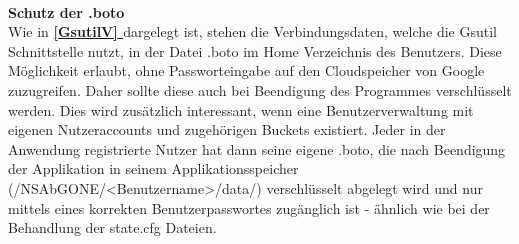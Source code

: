 \documentclass[13pt,a4paper,bibliography=totocnumbered,listof=totocnumbered]{scrartcl}
\newcommand*{\fullref}[1]{\textbf{\hyperref[{#1}]{\ref*{#1} \nameref*{#1}}}}
\begin{document}
\\\textbf{Schutz der .boto}\\
Wie in \fullref{GsutilV} dargelegt ist, stehen die Verbindungsdaten, welche die Gsutil Schnittstelle nutzt, in der Datei .boto im Home Verzeichnis des Benutzers. Diese Möglichkeit erlaubt, ohne Passworteingabe auf den Cloudspeicher von Google zuzugreifen. Daher sollte diese auch bei Beendigung des Programmes verschlüsselt werden. Dies wird zusätzlich interessant, wenn eine Benutzerverwaltung mit eigenen Nutzeraccounts und zugehörigen Buckets existiert. Jeder in der Anwendung registrierte Nutzer hat dann seine eigene .boto, die nach Beendigung der Applikation in seinem Applikationsspeicher (/NSAbGONE/\textless Benutzername\textgreater /data/) verschlüsselt abgelegt wird und nur mittels eines korrekten Benutzerpasswortes zugänglich ist - ähnlich wie bei der Behandlung der state.cfg Dateien.
\end{document}
